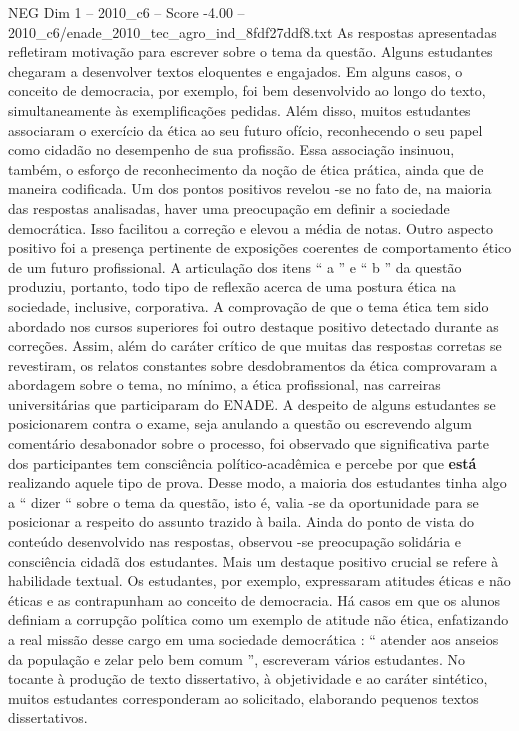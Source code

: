 \begin{textsample}{NEG Dim 1 – 2010\_c6 – Score -4.00 – 2010\_c6/enade\_2010\_tec\_agro\_ind\_8fdf27ddf8.txt}
As respostas apresentadas refletiram motivação para escrever sobre o tema da questão.
Alguns estudantes chegaram a desenvolver textos eloquentes e engajados.
Em alguns casos, o conceito de democracia, por exemplo, foi bem desenvolvido ao longo do texto, simultaneamente às exemplificações pedidas.
Além disso, muitos estudantes associaram o exercício da ética ao seu futuro ofício, reconhecendo o seu papel como cidadão no desempenho de sua profissão.
Essa associação insinuou, também, o esforço de reconhecimento da noção de ética prática, ainda que de maneira codificada.
Um dos pontos positivos revelou -se no fato de, na maioria das respostas analisadas, haver uma preocupação em definir a sociedade democrática.
Isso facilitou a correção e elevou a média de notas.
Outro aspecto positivo foi a presença pertinente de exposições coerentes de comportamento ético de um futuro profissional.
A articulação dos itens “ a ” e “ b ” da questão produziu, portanto, todo tipo de reflexão acerca de uma postura ética na sociedade, inclusive, corporativa.
A comprovação de que o tema ética tem sido abordado nos cursos superiores foi outro destaque positivo detectado durante as correções.
Assim, além do caráter crítico de que muitas das respostas corretas se revestiram, os relatos constantes sobre desdobramentos da ética comprovaram a abordagem sobre o tema, no mínimo, a ética profissional, nas carreiras universitárias que participaram do ENADE.
A despeito de alguns estudantes se posicionarem contra o exame, seja anulando a questão ou escrevendo algum comentário desabonador sobre o processo, foi observado que significativa parte dos participantes tem consciência político-acadêmica e percebe por que \textbf{está} realizando aquele tipo de prova.
Desse modo, a maioria dos estudantes tinha algo a “ dizer “ sobre o tema da questão, isto é, valia -se da oportunidade para se posicionar a respeito do assunto trazido à baila.
Ainda do ponto de vista do conteúdo desenvolvido nas respostas, observou -se preocupação solidária e consciência cidadã dos estudantes.
Mais um destaque positivo crucial se refere à habilidade textual.
Os estudantes, por exemplo, expressaram atitudes éticas e não éticas e as contrapunham ao conceito de democracia.
Há casos em que os alunos definiam a corrupção política como um exemplo de atitude não ética, enfatizando a real missão desse cargo em uma sociedade democrática : “ atender aos anseios da população e zelar pelo bem comum ”, escreveram vários estudantes.
No tocante à produção de texto dissertativo, à objetividade e ao caráter sintético, muitos estudantes corresponderam ao solicitado, elaborando pequenos textos dissertativos.

\end{textsample}
